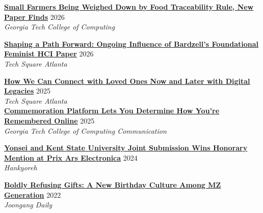 \noindent \href{https://www.cc.gatech.edu/news/small-farmers-being-weighed-down-food-traceability-rule-new-paper-finds}{\textbf{Small Farmers Being Weighed Down by Food Traceability Rule, New Paper Finds}} \hfill{2026}\\
\textit{Georgia Tech College of Computing}\\

\vspace{-0.25cm}

\noindent \href{https://www.techsquareatl.com/tech-square-news/2026/10/13/shaping-a-path-forward-ongoing-influence-of-bardzells-foundational-feminist-hci-paper}{\textbf{Shaping a Path Forward: Ongoing Influence of Bardzell's Foundational Feminist HCI Paper}} \hfill{2026}\\
\textit{Tech Square Atlanta}\\

\vspace{-0.25cm}

\noindent \href{https://www.techsquareatl.com/tech-square-news/how-we-can-connect-with-loved-ones-now-and-later-with-digital-legacies}{\textbf{How We Can Connect with Loved Ones Now and Later with Digital Legacies}} \hfill{2025}\\
\textit{Tech Square Atlanta}\\

\noindent \href{https://www.cc.gatech.edu/news/commemoration-platform-lets-you-determine-how-youre-remembered-online}{\textbf{Commemoration Platform Lets You Determine How You're Remembered Online}} \hfill{2025}\\
\textit{Georgia Tech College of Computing Communication}\\

\vspace{-0.25cm}

\noindent \href{https://www.hani.co.kr/arti/economy/biznews/1146119.html}{\textbf{Yonsei and Kent State University Joint Submission Wins Honorary Mention at Prix Ars Electronica}} \hfill{2024}\\
\textit{Hankyoreh}\\

\vspace{-0.25cm}

\noindent  \href{https://www.joongang.co.kr/article/25078626}{\textbf{Boldly Refusing Gifts: A New Birthday Culture Among MZ Generation}} \hfill{2022}\\
\textit{Joongang Daily}\\
